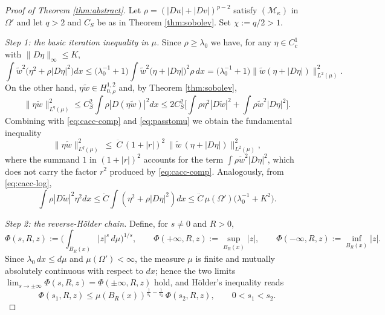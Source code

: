 \documentclass[reqno]{amsart}
\theoremstyle{plain}
\theoremstyle{definition}
\theoremstyle{remark}
\begin{document}
\begin{proof}[Proof of Theorem \ref{thm:abstract}]
Let $\rho=(|Du|+|Dv|)^{p-2}$ satisfy $(\mathcal M_\kappa)$ in $\Omega'$ and let $q>2$ and $C_S$ be
as in Theorem \ref{thm:sobolev}. Set $\chi:=q/2>1$.

\emph{Step 1: the basic iteration inequality in $\mu$.} Since $\rho\ge\lambda_0$ we have, for any
$\eta\in C_c^1$ with $\|D\eta\|_\infty\le K$,
\begin{equation}\label{eq:passtomu}
\int \widetilde w^{2}\big(\eta^2+\rho|D\eta|^2\big)dx
\le \big(\lambda_0^{-1}+1\big)\int \widetilde w^{2}\big(\eta+|D\eta|\big)^2\rho\,dx
=\big(\lambda_0^{-1}+1\big)\big\|\widetilde w(\eta+|D\eta|)\big\|_{L^2(\mu)}^2 .
\end{equation}
On the other hand, $\eta\widetilde w\in H^{1,2}_{0,\rho}$ and, by Theorem \ref{thm:sobolev},
\[
\|\eta\widetilde w\|_{L^{q}(\mu)}^2\le C_S^2\int\rho|D(\eta\widetilde w)|^2dx
\le 2C_S^2\Big[\int\rho\eta^2|D\widetilde w|^2+\int\rho\widetilde w^2|D\eta|^2\Big].
\]
Combining with \eqref{eq:cacc-comp} and \eqref{eq:passtomu} we obtain the fundamental inequality
\begin{equation}\label{eq:fundamental}
\|\eta\widetilde w\|_{L^{q}(\mu)}^2\ \le\ \ddot C\,(1+|r|)^2\,\big\|\widetilde w\,(\eta+|D\eta|)\big\|_{L^2(\mu)}^2 ,
\end{equation}
where the summand $1$ in $(1+|r|)^2$ accounts for the term $\int\rho\widetilde w^2|D\eta|^2$, which
does not carry the factor $r^2$ produced by \eqref{eq:cacc-comp}.
Analogously, from \eqref{eq:cacc-log},
\begin{equation}\label{eq:fundamental-log}
\int\rho|D\widetilde w|^2\eta^2dx\le \ddot C\int(\eta^2+\rho|D\eta|^2)dx\le \ddot C\,\mu(\Omega')\big(\lambda_0^{-1}+K^2\big) .
\end{equation}

\emph{Step 2: the reverse-H\"older chain.} Define, for $s\ne0$ and $R>0$,
\[
\Phi(s,R,z):=\Big(\int_{B_R(x)}|z|^{s}\,d\mu\Big)^{1/s},\qquad
\Phi(+\infty,R,z):=\sup_{B_R(x)}|z|,\qquad \Phi(-\infty,R,z):=\inf_{B_R(x)}|z| .
\]
Since $\lambda_0\,dx\le d\mu$ and $\mu(\Omega')<\infty$, the measure $\mu$ is finite and mutually
absolutely continuous with respect to $dx$; hence the two limits
$\lim_{s\to\pm\infty}\Phi(s,R,z)=\Phi(\pm\infty,R,z)$ hold, and H\"older's inequality reads
\begin{equation}\label{eq:holderPhi}
\Phi(s_1,R,z)\le\mu(B_R(x))^{\frac1{s_1}-\frac1{s_2}}\,\Phi(s_2,R,z),\qquad 0<s_1<s_2 .
\end{equation}


\end{proof}
\end{document}
